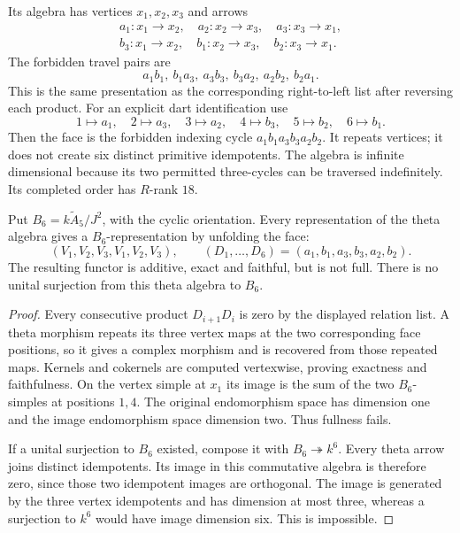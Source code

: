 Its algebra has vertices $x_1,x_2,x_3$ and arrows
\[
 \begin{gathered}
 a_1:x_1\to x_2,\quad a_2:x_2\to x_3,\quad a_3:x_3\to x_1,\\
 b_3:x_1\to x_2,\quad b_1:x_2\to x_3,\quad b_2:x_3\to x_1.
\end{gathered}
\]
The forbidden travel pairs are
\[
 a_1b_1,\ b_1a_3,\ a_3b_3,\ b_3a_2,\ a_2b_2,\ b_2a_1.
\]
This is the same presentation as the corresponding right-to-left list after
reversing each product. For an explicit dart identification use
\[
 1\mapsto a_1,\quad2\mapsto a_3,\quad3\mapsto a_2,
 \quad4\mapsto b_3,\quad5\mapsto b_2,\quad6\mapsto b_1.
\]
Then the face is the forbidden indexing cycle
$a_1b_1a_3b_3a_2b_2$. It repeats vertices; it does not create six distinct
primitive idempotents. The algebra is infinite dimensional because its two
permitted three-cycles can be traversed indefinitely. Its completed order has
$R$-rank $18$.

\begin{proposition}
\label{arb:unfold}
Put $B_6=k\widetilde A_5/J^2$, with the cyclic orientation. Every representation
of the theta algebra gives a $B_6$-representation by unfolding the face:
\[
 (V_1,V_2,V_3,V_1,V_2,V_3),\qquad
 (D_1,\ldots,D_6)=(a_1,b_1,a_3,b_3,a_2,b_2).
\]
The resulting functor is additive, exact and faithful, but is not full. There is
no unital surjection from this theta algebra to $B_6$.
\end{proposition}
\begin{proof}
Every consecutive product $D_{i+1}D_i$ is zero by the displayed relation list.
A theta morphism repeats its three vertex maps at the two corresponding face
positions, so it gives a complex morphism and is recovered from those repeated
maps. Kernels and cokernels are computed vertexwise, proving exactness and
faithfulness. On the vertex simple at $x_1$ its image is the sum of the two
$B_6$-simples at positions $1,4$. The original endomorphism space has dimension
one and the image endomorphism space dimension two. Thus fullness fails.

If a unital surjection to $B_6$ existed, compose it with
$B_6\twoheadrightarrow k^6$. Every theta arrow joins distinct idempotents.
Its image in this commutative algebra is therefore zero, since those two
idempotent images are orthogonal. The image is generated by the three vertex
idempotents and has dimension at most three, whereas a surjection to $k^6$
would have image dimension six. This is impossible.
\end{proof}

